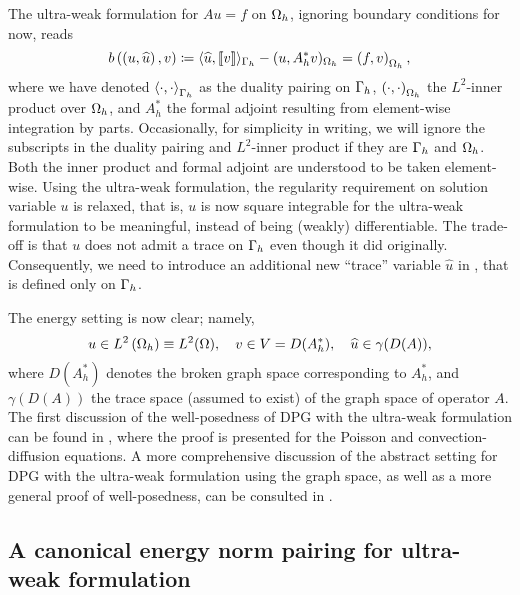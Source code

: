 The ultra-weak formulation for $Au = f$ on $\Oh$, ignoring boundary
conditions for now, reads
\begin{equation}
\eqnlab{uweak}
b\left(\left(u, \widehat{u}\right),v\right) \coloneqq \langle \widehat{u}, \jump{v}
\rangle_{\Gh} - (u,A_h^*v)_{\Oh}= \LRp{f,v}_{\Oh},
\end{equation}
where we have denoted $\LRa{\cdot,\cdot}_{\Gh}$ as the duality
pairing on $\Gh$, $\LRp{\cdot,\cdot}_{\Oh}$ the $L^2$-inner
product over $\Oh$, and $A_h^*$ the formal adjoint resulting from
element-wise integration by parts.  Occasionally, for simplicity in
writing, we will ignore the subscripts in the duality pairing and
$L^2$-inner product if they are $\Gh$ and $\Oh$. Both the
inner product and formal adjoint are understood to be taken
element-wise. Using the ultra-weak formulation, the regularity
requirement on solution variable $u$ is relaxed, that is, $u$ is now
square integrable for the ultra-weak formulation  to be
meaningful, instead of being (weakly) differentiable.  The trade-off
is that $u$ does not admit a trace on $\Gh$ even though it did
originally. Consequently, we need to introduce an additional new
``trace'' variable $\widehat{u}$ in , that is defined only on
$\Gh$.

The energy setting is now clear; namely,
\[
u\in L^2\LRp{\Oh} \equiv L^2(\Omega), \quad v\in V=D(A^*_h), \quad
\widehat{u}\in \gamma(D(A)),
\]
where $D(A_h^*)$ denotes the broken graph space corresponding to $A_h^*$,
and $\gamma(D(A))$ the trace space (assumed to exist) of the graph space of
operator $A$. The first discussion of the well-posedness of DPG with the ultra-weak formulation can be found in \cite{analysisDPG}, where the proof is presented for the Poisson and convection-diffusion equations. A more comprehensive discussion of the abstract setting for DPG with the ultra-weak formulation using the graph space, as well as a more general proof of well-posedness, can be consulted in \cite{Bui-ThanhDemkowiczGhattas11b}. 

\subsection{A canonical energy norm pairing for ultra-weak formulation}

